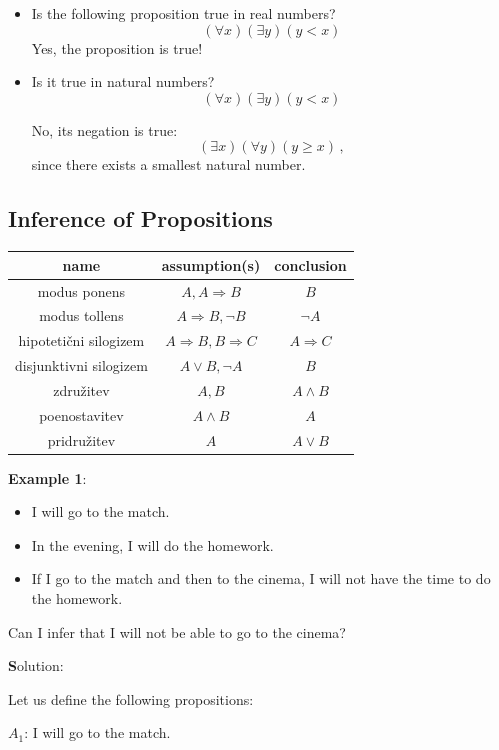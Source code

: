\documentclass[11pt,paper=b5,footinclude,headinclude]{scrbook} %
\theoremstyle{remark}
\theoremstyle{definition} %
\begin{document}
\begin{itemize}
  \item Is the following proposition true in real numbers?
  $$(\forall x)(\exists y)(y<x)$$
  Yes, the proposition is true!

  \item Is it true in natural numbers?
  $$(\forall x)(\exists y)(y<x)$$

No, its negation is true:
$$(\exists x)(\forall y)(y\ge x)\,,$$
since there exists a smallest natural number.
\end{itemize}
\subsection*{Inference of Propositions}

\begin{center}
\begin{tabular}{|c|c|c|}
	\hline 
	name & assumption(s) & conclusion\\
	\hline 
	\hline 
	modus ponens & $A,A\Rightarrow B$ & $B$\\
	\hline 
	modus tollens & $A\Rightarrow B,\neg B$ & $\neg A$\\
	\hline 
	hipoteti\v{c}ni silogizem & $A\Rightarrow B,B\Rightarrow C$ & $A\Rightarrow C$\\
	\hline 
	disjunktivni silogizem & $A\vee B,\neg A$ & $B$\\
	\hline 
	združitev  & $A,B$ & $A\wedge B$\\
	\hline 
	poenostavitev & $A\wedge B$ & $A$\\
	\hline 
	pridružitev & $A$ & $A\vee B$\\
	\hline 
\end{tabular}
\end{center}

\textbf{Example 1}:
\begin{itemize}
	\item I will go to the match.
	\item In the evening, I will do the homework.
	\item If I go to the match and then to the cinema, I will not have the time to do the homework.
\end{itemize}
Can I infer that I will not be able to go to the cinema?

\medskip
{\textbf Solution:}

Let us define the following propositions:

$A_1$: I will go to the match.
\end{document}
